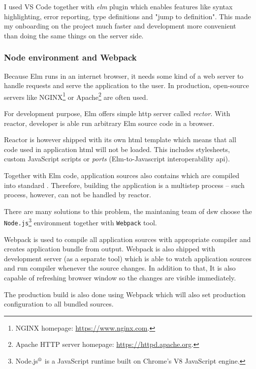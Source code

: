 I used VS Code together with \textit{elm}\cite{gh-elm-pg} plugin which enables features like syntax highlighting, error reporting, type definitions and "jump to definition".
This made my onboarding on the project much faster and development more convenient than doing the same things on the server side.

\subsubsection*{Node environment and Webpack}

Because Elm runs in an internet browser, it needs some kind of a web server to handle requests and serve the application to the user.
In production, open-source servers like NGINX\footnote{NGINX homepage: \url{https://www.nginx.com}.} or Apache\footnote{Apache HTTP server homepage: \url{https://httpd.apache.org}.} are often used\cite{nc-webservers}.

For development purpose, Elm offers simple \gls{http} server called \textit{rector}.
With reactor, developer is able run arbitrary Elm source code in a browser.

Reactor is however shipped with its own \gls{html} template which means that all code used in application \gls{html} will not be loaded.
This includes stylesheets, custom JavaScript scripts or \textit{ports} (Elm-to-Javascript interoperability \gls{api}).

Together with Elm code, application sources also contains  which are compiled into standard .
Therefore, building the application is a multistep process -- such process, however, can not be handled by reactor.

There are many solutions to this problem, the maintaning team of \gls{dsw} choose the \texttt{Node.js}\footnote{Node.js$^\textrm{\textregistered}$ is a JavaScript runtime built on Chrome's V8 JavaScript engine.} environment together with \texttt{Webpack} tool.

Webpack is used to compile all application sources with appropriate compiler and creates application bundle from output.
Webpack is also shipped with development server (as a separate tool) which is able to watch application sources and run compiler whenever the source changes.
In addition to that, It is also capable of refreshing browser window so the changes are visible immediately.

The production build is also done using Webpack which will also set production configuration to all bundled sources.

